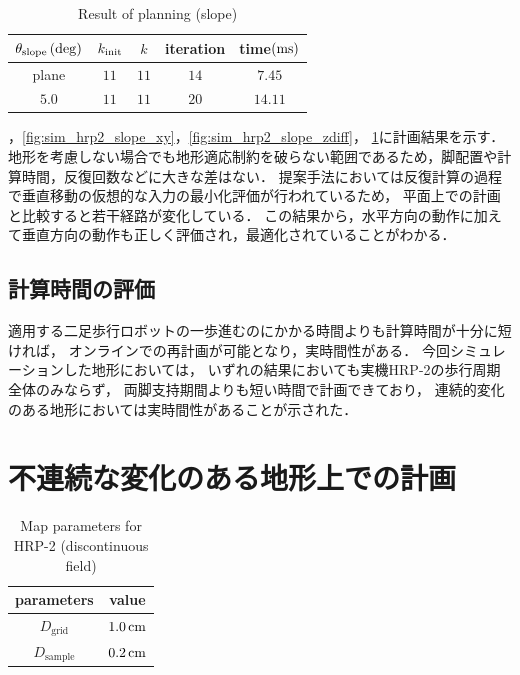 \documentclass[autodetect-engine,dvipdfmx-if-dvi,ja=standard,a4j,jbase=11pt,magstyle=nomag*]{bxjsreport}
\begin{document}
\begin{table}[t]%
    \caption{Result of planning (slope)}%
    \label{tab:sim_hrp2_slope}%
    \centering%
    \begin{tabular}{ccccc}%
        \toprule%
        $\theta_{\mathrm{slope}}\,(\mathrm{deg})$ &   $k_{\mathrm{init}}$ &   $k$     &   iteration   &   time$(\si{\milli\second})$ \\%
        \midrule%
        plane                       &   $11$        &   $11$    &   $14$        &   $7.45$ \\%
        $5.0$                       &   $11$        &   $11$    &   $20$        &   $14.11$ \\%
        \bottomrule%
    \end{tabular}
\end{table}
，\cref{fig:sim_hrp2_slope_xy}，\cref{fig:sim_hrp2_slope_zdiff}，
\cref{tab:sim_hrp2_slope}に計画結果を示す．
地形を考慮しない場合でも地形適応制約を破らない範囲であるため，脚配置や計算時間，反復回数などに大きな差はない．
提案手法においては反復計算の過程で垂直移動の仮想的な入力の最小化評価が行われているため，
平面上での計画と比較すると若干経路が変化している．
この結果から，水平方向の動作に加えて垂直方向の動作も正しく評価され，最適化されていることがわかる．


\subsection{計算時間の評価}
適用する二足歩行ロボットの一歩進むのにかかる時間よりも計算時間が十分に短ければ，
オンラインでの再計画が可能となり，実時間性がある．
今回シミュレーションした地形においては，
いずれの結果においても実機HRP-2の歩行周期全体のみならず，
両脚支持期間よりも短い時間で計画できており，
連続的変化のある地形においては実時間性があることが示された．




\section{不連続な変化のある地形上での計画}
\begin{table}[t]%
    \centering
    \caption{Map parameters for HRP-2 (discontinuous field)}
    \label{tab:sim_hrp2_param_map_discon}
    \begin{tabular}{cc}
        \toprule
        parameters              &   value \\
        \midrule
        $D_\mathrm{grid}$       &   $1.0\,\si{\centi\meter}$ \\
        $D_\mathrm{sample}$     &   $0.2\,\si{\centi\meter}$ \\
        \bottomrule
    \end{tabular}
\end{table}
\end{document}
